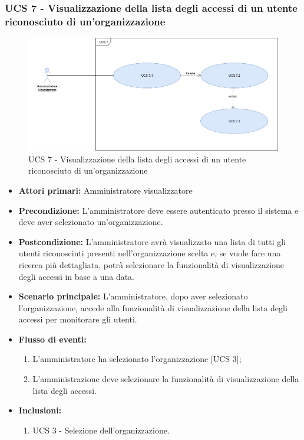 \newpage

\subsubsection{UCS 7 - Visualizzazione della lista degli accessi di un utente riconosciuto di un'organizzazione}

\begin{figure}[h]
	\centering
	\includegraphics[scale=0.3]{sezioni/UseCase/Immagini/UCS7.png}
	\caption{UCS 7 - Visualizzazione della lista degli accessi di un utente riconosciuto di un'organizzazione}
\end{figure}

\begin{itemize}
\item \textbf{Attori primari:} Amministratore visualizzatore
\item \textbf{Precondizione:} L'amministratore deve essere autenticato presso il sistema e deve aver selezionato un'organizzazione.
\item \textbf{Postcondizione:} L'amministratore avrà visualizzato una lista di tutti gli utenti riconosciuti presenti nell'organizzazione scelta e, se vuole fare una ricerca più dettagliata, potrà selezionare la funzionalità di visualizzazione degli accessi in base a una data.
\item \textbf{Scenario principale:} L'amministratore, dopo aver selezionato l'organizzazione, accede alla funzionalità di visualizzazione della lista degli accessi per monitorare gli utenti.
\item \textbf{Flusso di eventi:} 
\begin{enumerate}
	\item L'amministratore ha selezionato l'organizzazione [UCS 3];
	\item L'amministrazione deve selezionare la funzionalità di visualizzazione della lista degli accessi.
\end{enumerate}
\item \textbf{Inclusioni:}
\begin{enumerate}
	\item UCS 3 - Selezione dell'organizzazione.
\end{enumerate}
\end{itemize}

